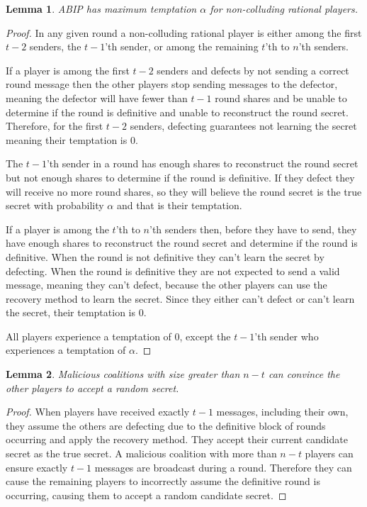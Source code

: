 \documentclass{dalcsthesis}
\newtheorem{lemma}{Lemma}
\begin{document}
\begin{lemma}\label{Lem:ABIP:SoloTemptation}ABIP has maximum temptation $\alpha$ for non-colluding rational players.\end{lemma}
\begin{proof}
In any given round a non-colluding rational player is either among the first $t-2$ senders, the $t-1$'th sender, or among the remaining $t$'th to $n$'th senders.

If a player is among the first $t-2$ senders and defects by not sending a correct round message then the other players stop sending messages to the defector, meaning the defector will have fewer than $t-1$ round shares and be unable to determine if the round is definitive and unable to reconstruct the round secret. Therefore, for the first $t-2$ senders, defecting guarantees not learning the secret meaning their temptation is $0$.

The $t-1$'th sender in a round has enough shares to reconstruct the round secret but not enough shares to determine if the round is definitive. If they defect they will receive no more round shares, so they will believe the round secret is the true secret with probability $\alpha$ and that is their temptation.

If a player is among the $t$'th to $n$'th senders then, before they have to send, they have enough shares to reconstruct the round secret and determine if the round is definitive. When the round is not definitive they can't learn the secret by defecting. When the round is definitive they are not expected to send a valid message, meaning they can't defect, because the other players can use the recovery method to learn the secret. Since they either can't defect or can't learn the secret, their temptation is $0$.

All players experience a temptation of $0$, except the $t-1$'th sender who experiences a temptation of $\alpha$.
\end{proof}

\begin{lemma}\label{Lem:ABIP:LargeMalTricks}Malicious coalitions with size greater than $n-t$ can convince the other players to accept a random secret.\end{lemma}
\begin{proof}
When players have received exactly $t-1$ messages, including their own, they assume the others are defecting due to the definitive block of rounds occurring and apply the recovery method. They accept their current candidate secret as the true secret. A malicious coalition with more than $n-t$ players can ensure exactly $t-1$ messages are broadcast during a round. Therefore they can cause the remaining players to incorrectly assume the definitive round is occurring, causing them to accept a random candidate secret.
\end{proof}
\end{document}
